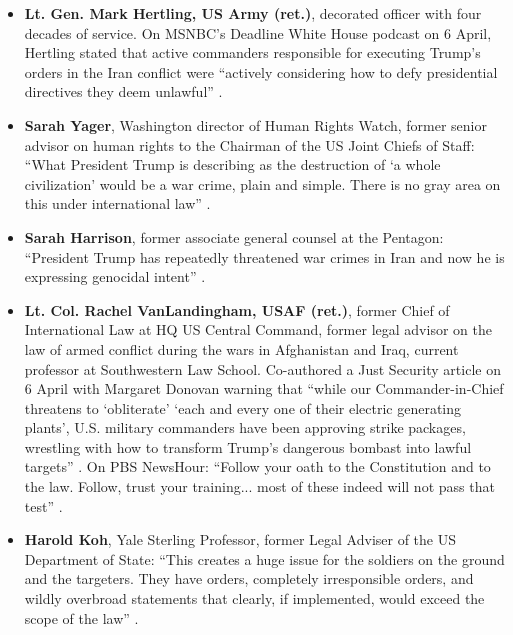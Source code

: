 \documentclass[12pt,a4paper]{article}
\begin{document}
\begin{itemize}[leftmargin=2em]
    \item \textbf{Lt. Gen. Mark Hertling, US Army (ret.)}, decorated officer with four decades of service. On MSNBC's Deadline White House podcast on 6 April, Hertling stated that active commanders responsible for executing Trump's orders in the Iran conflict were ``actively considering how to defy presidential directives they deem unlawful'' \cite{britbrief_hertling}.

    \item \textbf{Sarah Yager}, Washington director of Human Rights Watch, former senior advisor on human rights to the Chairman of the US Joint Chiefs of Staff: ``What President Trump is describing as the destruction of `a whole civilization' would be a war crime, plain and simple. There is no gray area on this under international law'' \cite{intercept_trump}.

    \item \textbf{Sarah Harrison}, former associate general counsel at the Pentagon: ``President Trump has repeatedly threatened war crimes in Iran and now he is expressing genocidal intent'' \cite{intercept_trump}.

    \item \textbf{Lt. Col. Rachel VanLandingham, USAF (ret.)}, former Chief of International Law at HQ US Central Command, former legal advisor on the law of armed conflict during the wars in Afghanistan and Iraq, current professor at Southwestern Law School. Co-authored a Just Security article on 6 April with Margaret Donovan warning that ``while our Commander-in-Chief threatens to `obliterate' `each and every one of their electric generating plants', U.S. military commanders have been approving strike packages, wrestling with how to transform Trump's dangerous bombast into lawful targets'' \cite{justsec_war_crimes}. On PBS NewsHour: ``Follow your oath to the Constitution and to the law. Follow, trust your training... most of these indeed will not pass that test'' \cite{pbs_vanlandingham}.

    \item \textbf{Harold Koh}, Yale Sterling Professor, former Legal Adviser of the US Department of State: ``This creates a huge issue for the soldiers on the ground and the targeters. They have orders, completely irresponsible orders, and wildly overbroad statements that clearly, if implemented, would exceed the scope of the law'' \cite{time_war_crimes}.
\end{itemize}
\end{document}
